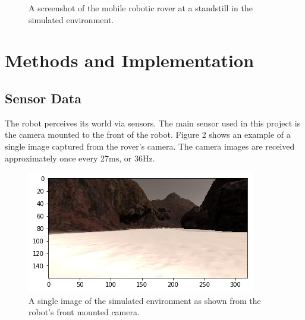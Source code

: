 \documentclass[a4paper]{article}
\begin{document}
\begin{figure}[h]
\centering
{}
\caption{A screenshot of the mobile robotic rover at a standstill in the simulated environment.}
\end{figure}

\section{Methods and Implementation}
\subsection{Sensor Data}
The robot perceives its world via sensors. The main sensor used in this project is the camera mounted to the front of the robot. Figure 2 shows an example of a single image captured from the rover's camera. The camera images are received approximately once every 27$\si{\milli\second}$, or 36$\si{\hertz}$.

\begin{figure}[h]
\centering
\includegraphics[scale=0.5]{image2}
\caption{A single image of the simulated environment as shown from the robot's front mounted camera.}
\end{figure}
\end{document}
